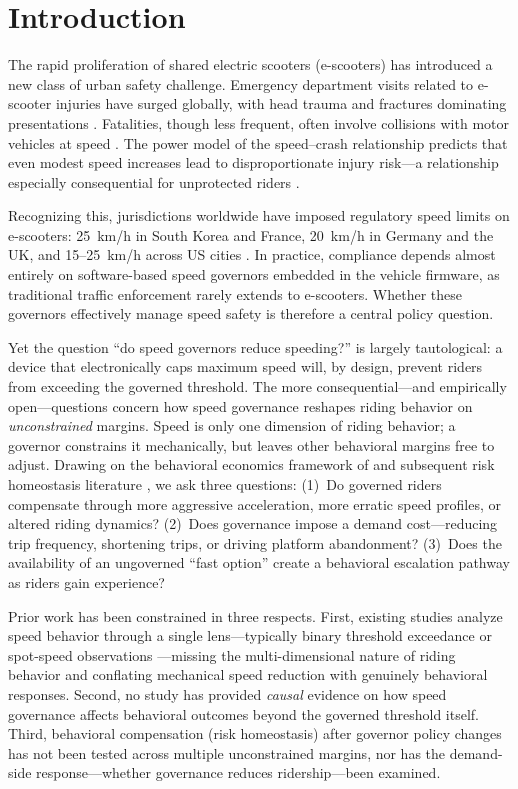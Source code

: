 \section{Introduction}
\label{sec:introduction}

The rapid proliferation of shared electric scooters (e-scooters) has introduced a new class of urban safety challenge. Emergency department visits related to e-scooter injuries have surged globally, with head trauma and fractures dominating presentations \citep{trivedi2019injuries, bloom2021standing, badeau2019emergency}. Fatalities, though less frequent, often involve collisions with motor vehicles at speed \citep{yang2020safety}. The power model of the speed--crash relationship predicts that even modest speed increases lead to disproportionate injury risk---a relationship especially consequential for unprotected riders \citep{elvik2013reexamination}.

Recognizing this, jurisdictions worldwide have imposed regulatory speed limits on e-scooters: 25~km/h in South Korea and France, 20~km/h in Germany and the UK, and 15--25~km/h across US cities \citep{ma2021municipal, sexton2023shared}. In practice, compliance depends almost entirely on software-based speed governors embedded in the vehicle firmware, as traditional traffic enforcement rarely extends to e-scooters. Whether these governors effectively manage speed safety is therefore a central policy question.

Yet the question ``do speed governors reduce speeding?'' is largely tautological: a device that electronically caps maximum speed will, by design, prevent riders from exceeding the governed threshold. The more consequential---and empirically open---questions concern how speed governance reshapes riding behavior on \textit{unconstrained} margins. Speed is only one dimension of riding behavior; a governor constrains it mechanically, but leaves other behavioral margins free to adjust. Drawing on the behavioral economics framework of \citet{peltzman1975effects} and subsequent risk homeostasis literature \citep{wilde1982theory, hedlund2000risky}, we ask three questions: (1)~Do governed riders compensate through more aggressive acceleration, more erratic speed profiles, or altered riding dynamics? (2)~Does governance impose a demand cost---reducing trip frequency, shortening trips, or driving platform abandonment? (3)~Does the availability of an ungoverned ``fast option'' create a behavioral escalation pathway as riders gain experience?

Prior work has been constrained in three respects. First, existing studies analyze speed behavior through a single lens---typically binary threshold exceedance or spot-speed observations \citep{cicchino2023speed, ma2021escooter}---missing the multi-dimensional nature of riding behavior and conflating mechanical speed reduction with genuinely behavioral responses. Second, no study has provided \textit{causal} evidence on how speed governance affects behavioral outcomes beyond the governed threshold itself. Third, behavioral compensation (risk homeostasis) after governor policy changes has not been tested across multiple unconstrained margins, nor has the demand-side response---whether governance reduces ridership---been examined.

